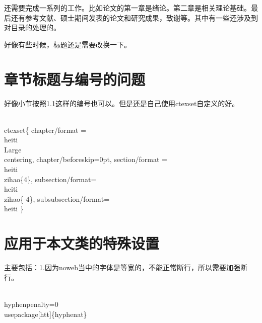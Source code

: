 \documentclass{hnuthesis}%
\begin{document}
还需要完成一系列的工作。比如论文的第一章是绪论。第二章是相关理论基础。最后还有参考文献、硕士期间发表的论文和研究成果，致谢等。其中有一些还涉及到对目录的处理的。

好像有些时候，标题还是需要改换一下。


\section{章节标题与编号的问题}

好像小节按照1.1这样的编号也可以。但是还是自己使用ctexset自定义的好。

\begin{nowebtrunk}
\nwenddocs{}\plusendmoddef\nwstartdeflinemarkup{}\nwenddeflinemarkup
\\ctexset\{
    chapter/format = \\heiti\\Large\\centering,
    chapter/beforeskip=0pt,
    section/format = \\heiti\\zihao\{4\},
    subsection/format=\\heiti\\zihao\{-4\},
    subsubsection/format=\\heiti
\}
\nwendcode{}\end{nowebtrunk}


\section{应用于本文类的特殊设置}

主要包括：1.因为noweb当中的字体是等宽的，不能正常断行，所以需要加强断行。

\begin{nowebtrunk}
\nwenddocs{}\plusendmoddef\nwstartdeflinemarkup{}\nwenddeflinemarkup
\\hyphenpenalty=0
\\usepackage[htt]\{hyphenat\}
\nwendcode{}\end{nowebtrunk}
\nwenddocs{}%
\end{document}
